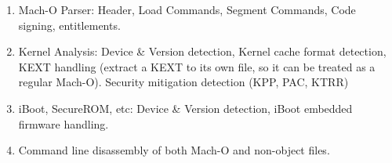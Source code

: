 \begin{enumerate}
	\item Mach-O Parser: Header, Load Commands, Segment Commands, Code signing, entitlements.
	\item Kernel Analysis: Device \& Version detection, Kernel cache format detection, KEXT handling (extract a KEXT to its own file, so it can be treated as a regular Mach-O). Security mitigation detection (KPP, PAC, KTRR)
	\item iBoot, SecureROM, etc: Device \& Version detection, iBoot embedded firmware handling.
	\item Command line disassembly of both Mach-O and non-object files.
\end{enumerate}
